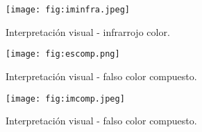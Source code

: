 
\begin{frame}{}
  \begin{figure}
    \centering
    \texttt{[image: fig:iminfra.jpeg]}
    \caption{Interpretación visual - infrarrojo color.}
    \label{}
  \end{figure}
\end{frame}



\begin{frame}{}
  \begin{figure}
    \centering
    \texttt{[image: fig:escomp.png]}
    \caption{Interpretación visual - falso color compuesto.}
    \label{}
  \end{figure}
\end{frame}


\begin{frame}{}
  \begin{figure}
    \centering
    \texttt{[image: fig:imcomp.jpeg]}
    \caption{Interpretación visual - falso color compuesto.}
    \label{}
  \end{figure}
\end{frame}

\gracias
